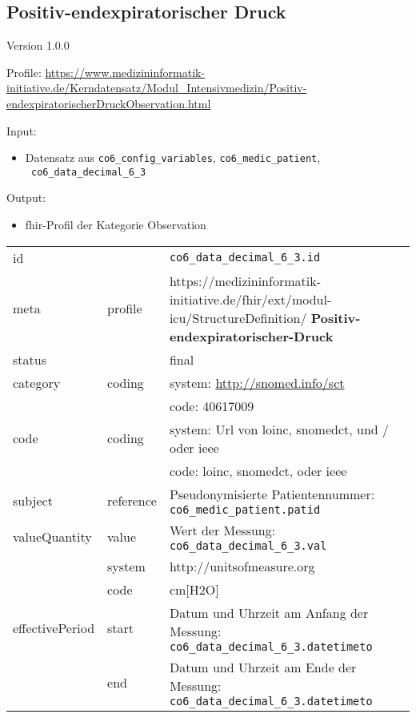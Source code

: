 \subsection{Positiv-endexpiratorischer Druck} 
\noindent Version 1.0.0

\noindent Profile: \url{https://www.medizininformatik-initiative.de/Kerndatensatz/Modul_Intensivmedizin/Positiv-endexpiratorischerDruckObservation.html}

\noindent Input:
\begin{itemize}
	\item Datensatz aus \texttt{co6\_config\_variables}, \texttt{co6\_medic\_patient}, \\ \texttt{
co6\_data\_decimal\_6\_3}
\end{itemize}
Output:
\begin{itemize}
        \item \ac{fhir}-Profil der Kategorie \glqq Observation\grqq{}
\end{itemize}
\begin{longtable}{|l|l|p{7.5cm}|}
        \hline
        \rowcolor{lightgray} \multicolumn{3}{|l|}{Data Mapping (inhaltlich)} \\ \hline
        id &  & \texttt{co6\_data\_decimal\_6\_3.id} \\ \hline
	meta & profile & https://medizininformatik-initiative.de/fhir/ext/modul-icu/StructureDefinition/\textbf{
Positiv-endexpiratorischer-Druck} \\ \hline 
	status &  & final  \\ \hline 
	category & coding & system: \url{http://snomed.info/sct} \\
\cline{3-3}
	& & code: 40617009 \\ \hline
	code & coding & system: Url von \ac{loinc}, \ac{snomedct}, und / oder \ac{ieee} \\ 
	\cline{3-3} 
	 &  & code: \ac{loinc}, \ac{snomedct}, oder \ac{ieee} \\ \hline
	subject & reference & Pseudonymisierte Patientennummer: \texttt{co6\_medic\_patient.patid} \\ \hline
	valueQuantity & value & Wert der Messung: \texttt{co6\_data\_decimal\_6\_3.val} \\
        \cline{2-3}
         & system & http://unitsofmeasure.org \\
         \cline{2-3}
         & code & cm[H2O] \\ \hline
    effectivePeriod & start & Datum und Uhrzeit am Anfang der Messung: \texttt{
co6\_data\_decimal\_6\_3.datetimeto} \\
    \cline{2-3}
     & end & Datum und Uhrzeit am Ende der Messung: \texttt{
co6\_data\_decimal\_6\_3.datetimeto} \\ \hline
\end{longtable}


